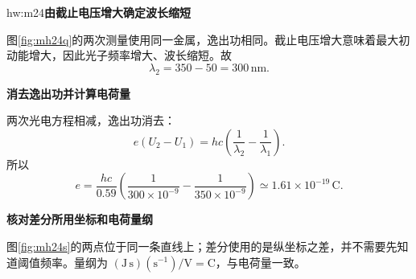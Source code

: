 \begin{drillsolution}{hw:m24}\textbf{由截止电压增大确定波长缩短}\par\nobreak
图\ref{fig:mh24q}的两次测量使用同一金属，逸出功相同。截止电压增大意味着最大初动能增大，因此光子频率增大、波长缩短。故
\[
 \boxed{\lambda_2=350-50=300\,\mathrm{nm}}.
\]


\par\medskip{}\noindent\textbf{消去逸出功并计算电荷量}\par\nobreak
两次光电方程相减，逸出功消去：
\[
 e(U_2-U_1)
 =hc\left(\frac1{\lambda_2}-\frac1{\lambda_1}\right).
\]
所以
\[
 \boxed{e=\frac{hc}{0.59}
 \left(\frac1{300\times10^{-9}}-\frac1{350\times10^{-9}}\right)
 \simeq1.61\times10^{-19}\,\mathrm C}.
\]



\par\medskip{}\noindent\textbf{核对差分所用坐标和电荷量纲}\par\nobreak
图\ref{fig:mh24s}的两点位于同一条直线上；差分使用的是纵坐标之差，并不需要先知道阈值频率。量纲为 \((\mathrm{J\,s})(\mathrm{s^{-1}})/\mathrm V=\mathrm C\)，与电荷量一致。

\end{drillsolution}

